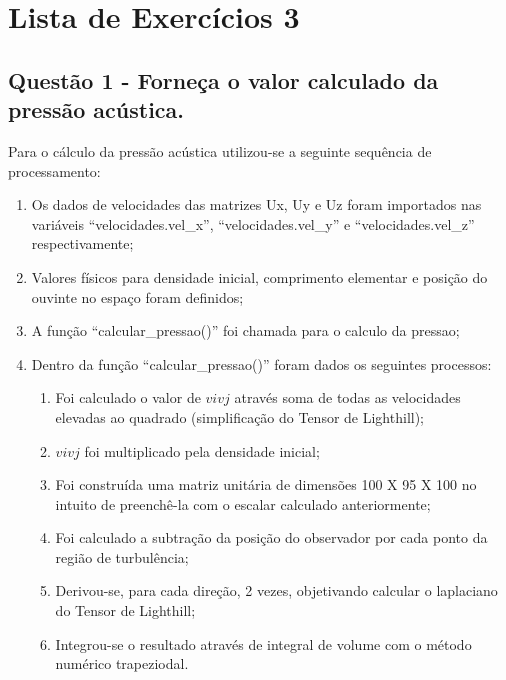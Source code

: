 \tableofcontents*
\cleardoublepage

\chapter{Lista de Exercícios 3}

\section{Questão 1 - Forneça o valor calculado da pressão acústica.}
Para o cálculo da pressão acústica utilizou-se a seguinte sequência de processamento:
\begin{enumerate}
	\item Os dados de velocidades das matrizes Ux, Uy e Uz foram importados nas variáveis
``velocidades.vel\_x'', ``velocidades.vel\_y'' e ``velocidades.vel\_z'' respectivamente;
	\item Valores físicos para densidade inicial, comprimento elementar e posição do ouvinte no espaço foram definidos;
	\item A função ``calcular\_pressao()'' foi chamada para o calculo da pressao;
	\item Dentro da função ``calcular\_pressao()'' foram dados os seguintes processos:
	\begin{enumerate} 
		\item Foi calculado o valor de \begin{math}vivj\end{math} através soma de todas as velocidades elevadas ao quadrado (simplificação do Tensor de Lighthill);
		\item \begin{math}vivj\end{math} foi multiplicado pela densidade inicial;
		\item Foi construída uma matriz unitária de dimensões 100 X 95 X 100 no intuito de preenchê-la com o escalar calculado anteriormente;
		\item Foi calculado a subtração da posição do observador por cada ponto da região de turbulência;
		\item Derivou-se, para cada direção, 2 vezes, objetivando calcular o laplaciano do Tensor de Lighthill;
		\item Integrou-se o resultado através de integral de volume com o método numérico trapeziodal.
	\end{enumerate}


\end{enumerate}

